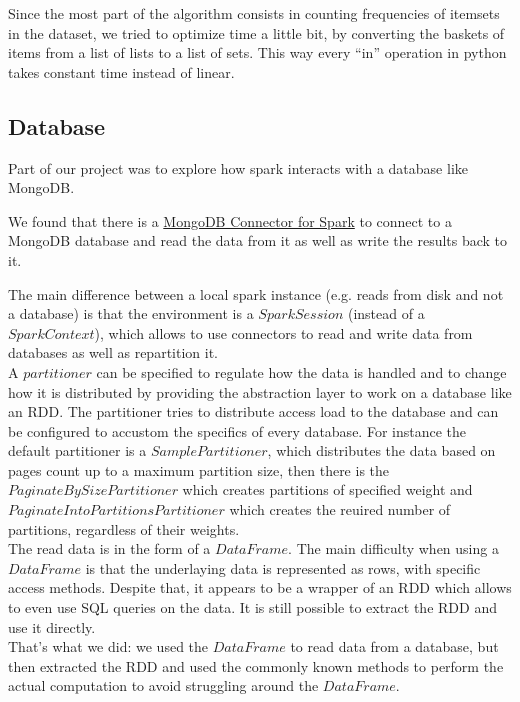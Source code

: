 \documentclass[a4paper]{article}
\begin{document}
	Since the most part of the algorithm consists in counting frequencies of itemsets in the dataset, we tried to optimize time a little bit, by converting the baskets of items from a list of lists to
	a list of sets. This way every ``in'' operation in python takes constant time instead of linear.\\

	\subsection{Database}
	Part of our project was to explore how spark interacts with a database like MongoDB.
	
	We found that there is a \href{https://www.mongodb.com/docs/spark-connector/current/}{MongoDB Connector for Spark} to connect to a MongoDB database and read the data from it as well as write the results back to it.
	
	The main difference between a local spark instance (e.g. reads from disk and not a database) is that the environment is a $SparkSession$ (instead of a $SparkContext$), which allows to use connectors 
	to read and write data from databases as well as repartition it.\\

	A $partitioner$ can be specified to regulate how the data is handled and to change how it is distributed by providing the abstraction layer to work on a database like an RDD. 
	The partitioner tries to distribute access load to the database and can be configured to accustom the specifics of every database. For instance the default partitioner is a $SamplePartitioner$, which
	distributes the data based on pages count up to a maximum partition size, then there is the $PaginateBySizePartitioner$ which creates partitions of specified weight and $PaginateIntoPartitionsPartitioner$
	which creates the reuired number of partitions, regardless of their weights.\\

	The read data is in the form of a $DataFrame$. The main difficulty when using a $DataFrame$ is that the underlaying data is represented as rows, with specific access methods. Despite that, it appears 
	to be a wrapper of an RDD which allows to even use SQL queries on the data. It is still possible to extract the RDD and use it directly. \\
	That's what we did: we used the $DataFrame$ to read data from a database, but then extracted the RDD and used the commonly known methods to perform the actual computation to avoid struggling around
	the $DataFrame$.\\
\end{document}
